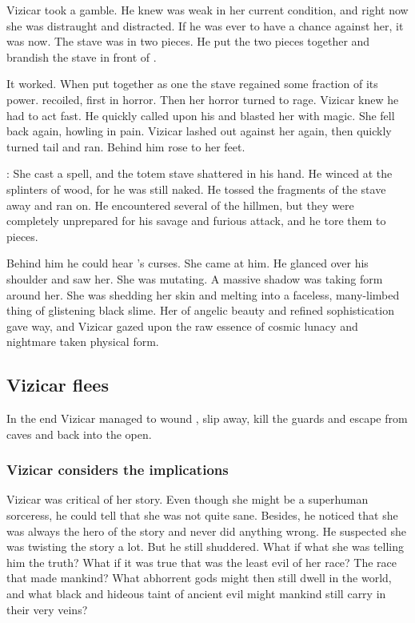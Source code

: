 Vizicar took a gamble.
He knew \Lethiarch was weak in her current condition, and right now she was distraught and distracted. 
If he was ever to have a chance against her, it was now. 
The stave was in two pieces. 
He put the two pieces together and brandish the stave in front of \Lethiarch.

It worked.
When put together as one the stave regained some fraction of its power. 
\Lethiarch recoiled, first in horror.
Then her horror turned to rage. 
Vizicar knew he had to act fast. 
He quickly called upon his \archons and blasted her with magic. 
She fell back again, howling in pain.
Vizicar lashed out against her again, then quickly turned tail and ran. 
Behind him \Lethiarch rose to her feet.

\Lethiarch:
She cast a spell, and the totem stave shattered in his hand.
He winced at the splinters of wood, for he was still naked. 
He tossed the fragments of the stave away and ran on. 
He encountered several of the hillmen, but they were completely unprepared for his savage and furious attack, and he tore them to pieces. 

Behind him he could hear \Lethiarch's curses. 
She came at him. 
He glanced over his shoulder and saw her.
She was mutating.
A massive shadow was taking form around her. 
She was shedding her \human skin and melting into a faceless, many-limbed thing of glistening black slime.
Her \facade of angelic beauty and refined sophistication gave way, and Vizicar gazed upon the raw essence of cosmic lunacy and nightmare taken physical form. 









\subsection{Vizicar flees}
In the end Vizicar managed to wound \Lethiarch, slip away, kill the guards and escape from caves and back into the open. 





\subsubsection{Vizicar considers the implications}
Vizicar was critical of her story. 
Even though she might be a superhuman sorceress, he could tell that she was not quite sane.
Besides, he noticed that she was always the hero of the story and never did anything wrong. 
He suspected she was twisting the story a lot.
But he still shuddered.
What if what she was telling him the truth?
What if it was true that \Lethiarch was the least evil of her race?
The race that made mankind?
What abhorrent gods might then still dwell in the world, and what black and hideous taint of ancient evil might mankind still carry in their very veins? 

